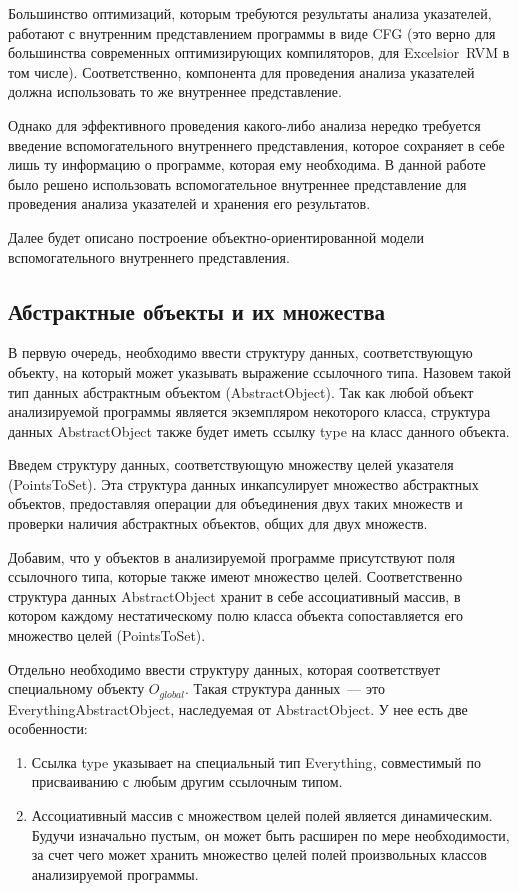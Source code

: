 \documentclass[14pt,titlepage]{extarticle}
\newcommand{\eng}[1]{{\English#1}}
\begin{document}
    Большинство оптимизаций, которым требуются результаты анализа указателей,
    работают с внутренним представлением программы в виде CFG (это верно для
    большинства современных оптимизирующих компиляторов, для
    \eng{Excelsior~RVM} в том числе). Соответственно, компонента для проведения
    анализа указателей должна использовать то же внутреннее представление.

    Однако для эффективного проведения какого-либо анализа нередко требуется
    введение вспомогательного внутреннего представления, которое сохраняет в
    себе лишь ту информацию о программе, которая ему необходима.
    В данной работе было решено использовать вспомогательное внутреннее
    представление для проведения анализа указателей и хранения его результатов.

    Далее будет описано построение объектно-ориентированной модели
    вспомогательного внутреннего представления.

    \subsection{Абстрактные объекты и их множества}

      В первую очередь, необходимо ввести структуру данных, соответствующую
      объекту, на который может указывать выражение ссылочного типа. Назовем
      такой тип данных абстрактным объектом (\eng{AbstractObject}). Так как
      любой объект анализируемой программы является экземпляром некоторого
      класса, структура данных \eng{AbstractObject} также будет иметь ссылку
      \eng{type} на класс данного объекта.

      Введем структуру данных, соответствующую множеству целей указателя
      (\eng{Points\-To\-Set}). Эта структура данных инкапсулирует
      множество абстрактных объектов, предоставляя операции для объединения двух
      таких множеств и проверки наличия абстрактных объектов, общих для двух
      множеств.

      Добавим, что у объектов в анализируемой программе присутствуют поля
      ссылочного типа, которые также имеют множество целей. Соответственно
      структура данных \eng{AbstractObject} хранит в себе
      ассоциативный массив, в котором каждому нестатическому полю класса объекта
      сопоставляется его множество целей (\eng{PointsToSet}).

      Отдельно необходимо ввести структуру данных, которая соответствует
      специальному объекту $O_{global}$. Такая структура данных~--- это
      \eng{Everything\-Abstract\-Object}, наследуемая от \eng{AbstractObject}.
      У нее есть две особенности:
      \begin{enumerate}
        \item Ссылка \eng{type} указывает на специальный тип \eng{Everything},
              совместимый по присваиванию с любым другим ссылочным типом.
        \item Ассоциативный массив с множеством целей полей является
              динамическим. Будучи изначально пустым, он может быть расширен
              по мере необходимости, за счет чего может хранить множество целей
              полей произвольных классов анализируемой программы.
      \end{enumerate}
\end{document}
